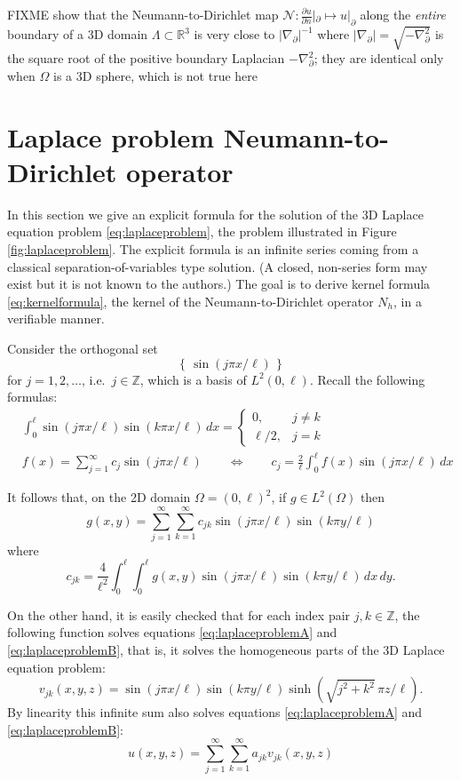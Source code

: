 \documentclass[letterpaper,final,12pt,reqno]{amsart}
\theoremstyle{cstyle}
\theoremstyle{cstyle*}
\theoremstyle{dstyle}
\newcommand{\RR}{\mathbb{R}}
\newcommand{\ZZ}{\mathbb{Z}}
\newcommand{\grad}{\nabla}
\begin{document}
FIXME \cite{Girouardetal2022} show that the Neumann-to-Dirichlet map $\mathcal{N}:\frac{\partial u}{\partial n}|_{\partial} \mapsto u|_{\partial}$ along the \emph{entire} boundary of a 3D domain $\Lambda \subset \RR^3$ is very close to $|\grad_{\partial}|^{-1}$ where $|\grad_{\partial}| = \sqrt{-\grad_{\partial}^2}$ is the square root of the positive boundary Laplacian $-\grad_{\partial}^2$; they are identical only when $\Omega$ is a 3D sphere, which is not true here





\appendix
\section{Laplace problem Neumann-to-Dirichlet operator}

In this section we give an explicit formula for the solution of the 3D Laplace equation problem \eqref{eq:laplaceproblem}, the problem illustrated in Figure \ref{fig:laplaceproblem}.  The explicit formula is an infinite series coming from a classical separation-of-variables type solution.  (A closed, non-series form may exist but it is not known to the authors.)  The goal is to derive kernel formula \eqref{eq:kernelformula}, the kernel of the Neumann-to-Dirichlet operator $N_h$, in a verifiable manner.

Consider the orthogonal set
    $$\left\{\,\sin(j\pi x/\ell)\,\right\}$$
for $j=1,2,\dots$, i.e.~$j\in \ZZ$, which is a basis of $L^2(0,\ell)$.  Recall the following formulas:
\begin{align*}
&\int_0^\ell \sin(j\pi x/\ell) \sin(k\pi x/\ell)\,dx = \begin{cases} 0, & j \ne k \\ \ell/2, & j=k \end{cases} \\
&f(x) = \sum_{j=1}^\infty c_j \sin(j\pi x/\ell) \qquad \iff \qquad c_j = \frac{2}{\ell} \int_0^\ell f(x) \sin(j\pi x/\ell)\,dx
\end{align*}

It follows that, on the 2D domain $\Omega = (0,\ell)^2$, if $g\in L^2(\Omega)$ then
    $$g(x,y) = \sum_{j=1}^\infty \sum_{k=1}^\infty c_{jk} \sin(j\pi x/\ell) \sin(k\pi y/\ell)$$
where
    $$c_{jk} = \frac{4}{\ell^2} \int_0^\ell \int_0^\ell g(x,y) \sin(j\pi x/\ell) \sin(k\pi y/\ell)\,dx\,dy.$$

On the other hand, it is easily checked that for each index pair $j,k \in \ZZ$, the following function solves equations \eqref{eq:laplaceproblemA} and \eqref{eq:laplaceproblemB}, that is, it solves the homogeneous parts of the 3D Laplace equation problem:
    $$v_{jk}(x,y,z) = \sin(j\pi x/\ell) \sin(k\pi y/\ell) \sinh(\sqrt{j^2+k^2}\, \pi z/\ell).$$
By linearity this infinite sum also solves equations \eqref{eq:laplaceproblemA} and \eqref{eq:laplaceproblemB}:
    $$u(x,y,z) = \sum_{j=1}^\infty \sum_{k=1}^\infty a_{jk} v_{jk}(x,y,z)$$
\end{document}

